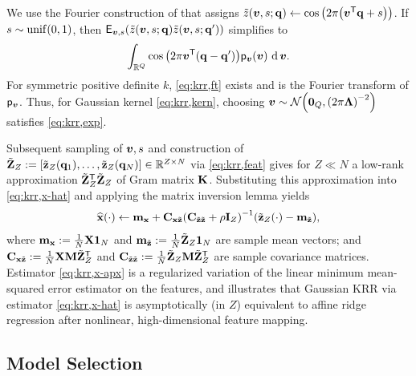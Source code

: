 We use the Fourier construction 
of \cite{rahimi:07:rff}
that assigns
$\zt\paren{\bmv,s;\bmq} 
\gets 
\cosa{2\pi\paren{\bmv\tpose \bmq + s}}$.
If $s\sim\unif{0,1}$, 
then 
$\expect{\bmv,s}{
		\zt\paren{\bmv,s;\bmq}
		\zt\paren{\bmv,s;\bmq'} 
}$
simplifies to
\begin{align}
	\int_{\reals{Q}} \cosa{2\pi\bmv\tpose\paren{\bmq-\bmq'}} \dist{\bmv}\paren{\bmv} \der{\bmv}.
	\label{eq:krr,ft}
\end{align}
For symmetric positive definite $k$,
\eqref{eq:krr,ft} exists \cite{wu:97:gbt} 
and is the Fourier transform 
of $\mathsf{p}_{\boldsymbol{v}}$.
Thus, for Gaussian kernel \eqref{eq:krr,kern},
choosing $\bmv\sim\gauss{\zeros{Q}}{\paren{2\pi\bmL}^{-2}}$
satisfies \eqref{eq:krr,exp}.

Subsequent sampling of $\boldsymbol{v},s$ 
and construction of 
$\bmZt := \brac{\bmztZa{\bmq_1},\dots,\bmztZa{\bmq_N}} \in \reals{Z \times N}$
via \eqref{eq:krr,feat}
gives for $Z \ll N$
a low-rank approximation $\tilde{\mathbf{Z}}_Z^{\mathsf{T}}\tilde{\mathbf{Z}}_Z$ 
of Gram matrix $\mathbf{K}$.
Substituting this approximation into \eqref{eq:krr,x-hat}
and applying the matrix inversion lemma \cite{woodbury:50:imm} 
yields
\begin{align}
	\esta{\bmx}{\cdot} \gets \bmmx + \Cxzt\inv{\Cztzt + \rho\eye{Z}} \paren{\bmztZa{\cdot} - \bmmzt},
	\label{eq:krr,x-apx}
\end{align}
where $\mathbf{m}_{\mathbf{x}} := \frac{1}{N}\mathbf{X}\boldsymbol{1}_{N}$ 
and $\mathbf{m}_{\tilde{\mathbf{z}}} := \frac{1}{N}\tilde{\mathbf{Z}}_Z\boldsymbol{1}_{N}$ 
are sample mean vectors; and
$\mathbf{C}_{\mathbf{x}\tilde{\mathbf{z}}} := \frac{1}{N}\mathbf{X}\mathbf{M}\tilde{\mathbf{Z}}_Z^{\mathsf{T}}$
and $\mathbf{C}_{\tilde{\mathbf{z}}\tilde{\mathbf{z}}} := \frac{1}{N}\tilde{\mathbf{Z}}_Z\mathbf{M}\tilde{\mathbf{Z}}_Z^{\mathsf{T}}$ 
are sample covariance matrices.
Estimator \eqref{eq:krr,x-apx} 
is a regularized variation
of the linear minimum mean-squared error estimator
on the features,
and illustrates
that Gaussian KRR via estimator \eqref{eq:krr,x-hat}
is asymptotically (in $Z$) equivalent
to affine ridge regression
after nonlinear, high-dimensional feature mapping.

\subsection{Model Selection}
\label{ss,krr,pract,mod}

